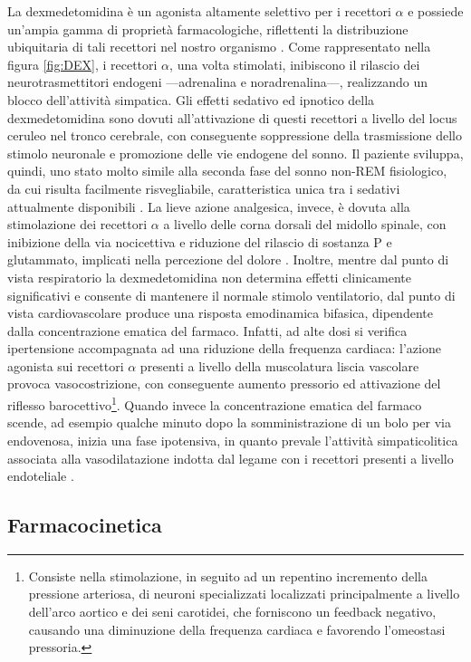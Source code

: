 La dexmedetomidina è un agonista altamente selettivo per i recettori $\alpha$ e possiede un'ampia gamma di proprietà farmacologiche, riflettenti la distribuzione ubiquitaria di tali recettori nel nostro organismo \cite{Keating2015}. Come rappresentato nella figura \ref{fig:DEX}, i recettori $\alpha$, una volta stimolati, inibiscono il rilascio dei neurotrasmettitori endogeni ---adrenalina e noradrenalina---, realizzando un blocco dell'attività simpatica. Gli effetti sedativo ed ipnotico della dexmedetomidina sono dovuti all'attivazione di questi recettori a livello del locus ceruleo nel tronco cerebrale, con conseguente soppressione della trasmissione dello stimolo neuronale e promozione delle vie endogene del sonno. Il paziente sviluppa, quindi, uno stato molto simile alla seconda fase del sonno non-REM fisiologico, da cui risulta facilmente risvegliabile, caratteristica unica tra i sedativi attualmente disponibili \cite{Weerink2017, Gertler2001}.
La lieve azione analgesica, invece, è dovuta alla stimolazione dei recettori $\alpha$ a livello delle corna dorsali del midollo spinale, con inibizione della via nocicettiva e riduzione del rilascio di sostanza P e glutammato, implicati nella percezione del dolore \cite{Weerink2017}. Inoltre, mentre dal punto di vista respiratorio la dexmedetomidina non determina effetti clinicamente significativi e consente di mantenere il normale stimolo ventilatorio, dal punto di vista cardiovascolare produce una risposta emodinamica bifasica, dipendente dalla concentrazione ematica del farmaco. Infatti, ad alte dosi si verifica ipertensione accompagnata ad una riduzione della frequenza cardiaca: l'azione agonista sui recettori $\alpha$ presenti a livello della muscolatura liscia vascolare provoca vasocostrizione, con conseguente aumento pressorio ed attivazione del riflesso barocettivo\footnote{Consiste nella stimolazione, in seguito ad un repentino incremento della pressione arteriosa, di neuroni specializzati localizzati principalmente a livello dell'arco aortico e dei seni carotidei, che forniscono un feedback negativo, causando una diminuzione della frequenza cardiaca e favorendo l'omeostasi pressoria.}. Quando invece la concentrazione ematica del farmaco scende, ad esempio qualche minuto dopo la somministrazione di un bolo per via endovenosa, inizia una fase ipotensiva, in quanto prevale l'attività simpaticolitica associata alla vasodilatazione indotta dal legame con i recettori presenti a livello endoteliale \cite{Weerink2017}. 

\subsection*{Farmacocinetica}

